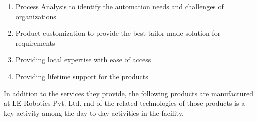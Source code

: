 \documentclass[a4paper,12pt]{report}
\begin{document}
\begin{enumerate}
	\item Process Analysis to identify the automation needs and  challenges of organizations
	\item Product customization to provide the best tailor-made solution for requirements
	\item Providing local expertise with ease of access
	\item Providing lifetime support for the products
\end{enumerate}

In addition to the services they provide, the following products are manufactured at LE Robotics Pvt. Ltd. \ac{rnd} of the related technologies of those products is a key activity among the day-to-day activities in the facility. 
\end{document}
